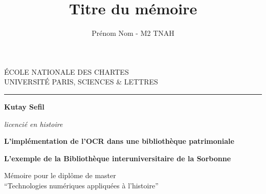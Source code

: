\documentclass[a4paper,12pt,twoside]{book}
\author{Prénom Nom - M2 TNAH}
\title{Titre du mémoire}
\begin{document}
	\begin{titlepage}
		\begin{center}
			
			\bigskip
			
			\begin{large}				
				ÉCOLE NATIONALE DES CHARTES\\
				UNIVERSITÉ PARIS, SCIENCES \& LETTRES
			\end{large}
			\begin{center}\rule{2cm}{0.02cm}\end{center}
			
			\bigskip
			\bigskip
			\bigskip
			\begin{Large}
				\textbf{Kutay Sefil}\\
			\end{Large}
			\begin{normalsize} \textit{licencié en histoire}\\
				
			\end{normalsize}
			
			\bigskip
			\bigskip
			\bigskip
			
			\begin{Huge}
				\textbf{L’implémentation de l’OCR dans une bibliothèque patrimoniale}\\
			\end{Huge}
			\bigskip
			\bigskip
			\begin{LARGE}
				\textbf{L’exemple de la Bibliothèque interuniversitaire de la Sorbonne}\\
			\end{LARGE}
			
			\bigskip
			\bigskip
			\bigskip
			\begin{large}
			\end{large}
			\vfill
			
			\begin{large}
				Mémoire 
				pour le diplôme de master \\
				\enquote{Technologies numériques appliquées à l'histoire} \\
			\end{large}
			
		\end{center}
	\end{titlepage}

	\thispagestyle{empty}	
	\cleardoublepage
	
\frontmatter
\end{document}
